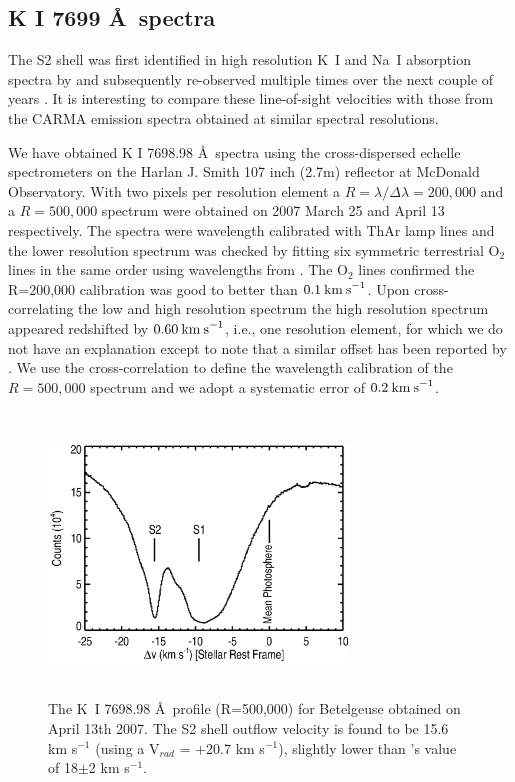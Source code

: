 \documentclass[iop]{emulateapj}
\begin{document}
\subsection{K I 7699 \AA \ spectra}

The S2 shell was first identified in high resolution K~I and Na~I absorption spectra by \cite{1975ApJ...199..427G} and subsequently re-observed multiple times over the next couple of years \citep{1979QJRAS..20..361G}. It is interesting to compare these line-of-sight velocities with those from the CARMA emission spectra obtained at similar spectral resolutions.

We have obtained K I 7698.98 \AA \ spectra using the cross-dispersed echelle spectrometers on the Harlan J. Smith 107 inch (2.7m) reflector at McDonald Observatory. With two pixels per resolution element a $R=\lambda/\Delta\lambda=200,000$ and a $R=500,000$ spectrum were obtained on 2007 March 25 and April 13 respectively. The spectra were wavelength calibrated with ThAr lamp lines and the lower resolution spectrum was checked by fitting six symmetric terrestrial O${}_2$ lines in the same order using wavelengths from \cite{1948ApJ...108..167B}. The O${}_2$ lines confirmed the R=200,000 calibration was good to better than $0.1\>{\rm km\>s}^{-1}$. Upon cross-correlating the low and high resolution spectrum the high resolution spectrum appeared redshifted by $0.60\>{\rm km\>s}^{-1}$, i.e., one resolution element, for which we do not have an explanation except to note that a similar offset has been reported by \cite{1994ApJ...436..152W}. We use the cross-correlation to define the wavelength calibration of the $R=500,000$ spectrum and we adopt a systematic error of $0.2\>{\rm km\>s}^{-1}$.

\begin{figure}
\includegraphics[trim=40pt 0pt 50pt 0pt, width=8.0cm, height=7.5cm]{f18.eps}
\caption{The K~I 7698.98 \AA \  profile (R=500,000) for Betelgeuse obtained on April 13th 2007. The S2 shell outflow velocity is found to be 15.6 km s${}^{-1}$ (using a V$_{rad}$ = +20.7 km s${}^{-1}$), slightly lower than \citeauthor{2002A&A...386.1009P}'s \citeyearpar{2002A&A...386.1009P} value of 18$\pm$2 km s${}^{-1}$.}
\label{fig:fig7}
\end{figure}
\end{document}
